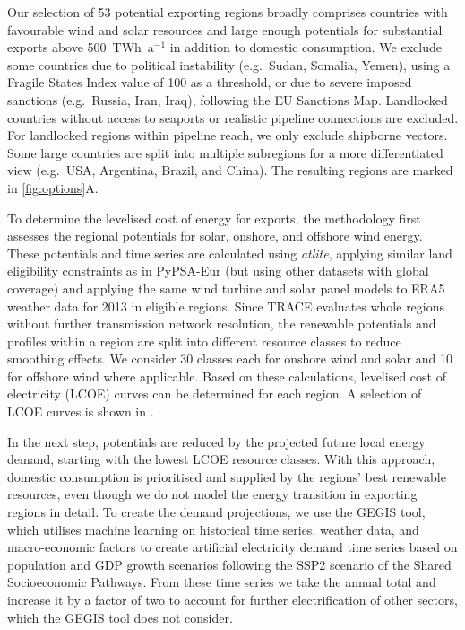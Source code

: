 Our selection of 53 potential exporting regions broadly comprises countries with
favourable wind and solar resources and large enough potentials for substantial
exports above 500~TWh~a$^{-1}$ in addition to domestic consumption. We exclude
some countries due to political instability (e.g.~Sudan, Somalia, Yemen), using
a Fragile States Index\cite{thefundforpeaceffpFragileStatesIndex2023} value of
100 as a threshold, or due to severe imposed sanctions (e.g.~Russia, Iran,
Iraq), following the EU Sanctions
Map.\cite{estonianpresidencyofthecounciloftheeuEUSanctionsMap2024} Landlocked
countries without access to seaports or realistic pipeline connections are
excluded. For landlocked regions within pipeline reach, we only exclude
shipborne vectors. Some large countries are split into multiple subregions for
a more differentiated view (e.g.~USA, Argentina, Brazil, and China). The
resulting regions are marked in \cref{fig:options}A.


To determine the levelised cost of energy for exports, the methodology first
assesses the regional potentials for solar, onshore, and offshore wind energy.
These potentials and time series are calculated using
\textit{atlite},\cite{hofmannAtliteLightweight2021} applying similar land
eligibility constraints as in PyPSA-Eur (but using other datasets with global
coverage) and applying the same wind turbine and solar panel models to
ERA5\cite{ecmwf} weather data for 2013 in eligible regions. Since TRACE
evaluates whole regions without further transmission network resolution, the
renewable potentials and profiles within a region are split into different
resource classes to reduce smoothing effects. We consider 30 classes each for
onshore wind and solar and 10 for offshore wind where applicable. Based on these
calculations, levelised cost of electricity (LCOE) curves can be determined for
each region. A selection of LCOE curves is shown in
.


In the next step, potentials are reduced by the projected future local energy
demand, starting with the lowest LCOE resource classes. With this approach,
domestic consumption is prioritised and supplied by the regions' best renewable
resources, even though we do not model the energy transition in exporting
regions in detail. To create the demand projections, we use the
GEGIS\cite{mattssonAutopilotEnergyModels2021} tool, which utilises machine
learning on historical time series, weather data, and macro-economic factors to
create artificial electricity demand time series based on population and GDP
growth scenarios following the SSP2 scenario of the Shared Socioeconomic
Pathways.\cite{riahiSharedSocioeconomicPathways2017} From these time series we
take the annual total and increase it by a factor of two to account for further
electrification of other sectors, which the GEGIS tool does not consider.

